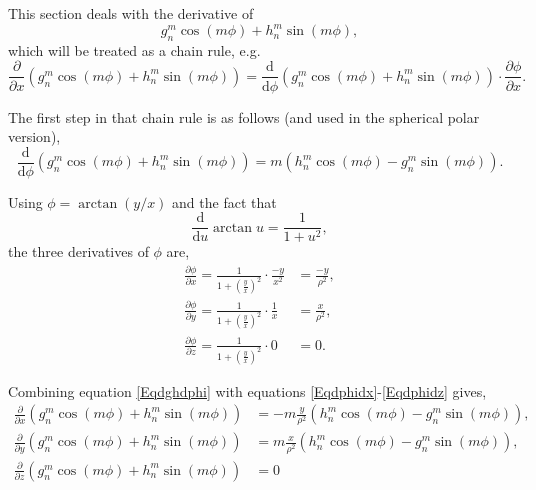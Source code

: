 \documentclass[]{article}
\begin{document}
			This section deals with the derivative of
			\begin{equation}
				g_n^m \cos{(m\phi)} + h_n^m\sin{(m\phi)},
			\end{equation}	
			which will be treated as a chain rule, e.g.
			\begin{equation}
				\frac{\partial}{\partial x}\left(g_n^m \cos{(m\phi)} + h_n^m\sin{(m\phi)}\right) = \frac{\text{d}}{\text{d}\phi}\left(g_n^m \cos{(m\phi)} + h_n^m\sin{(m\phi)}\right)\cdot\frac{\partial\phi}{\partial x}.
			\end{equation}
			
			The first step in that chain rule is as follows (and used in the spherical polar version),
			\begin{equation}
				\frac{\text{d}}{\text{d}\phi}\left(g_n^m \cos{(m\phi)} + h_n^m\sin{(m\phi)}\right) = m\left( h_n^m \cos{(m\phi)} - g_n^m \sin{(m\phi)}\right). \label{Eqdghdphi}
			\end{equation}
			
			Using $\phi = \arctan{(y/x)}$ and the fact that
			\begin{equation}
				\frac{\text{d}}{\text{d} u} \arctan{u} = \frac{1}{1 + u^2},
			\end{equation}
			the three derivatives of $\phi$ are,
			\begin{align}
				\frac{\partial \phi}{\partial x} = \frac{1}{1 + \left(\frac{y}{x}\right)^2}\cdot\frac{-y}{x^2} &= \frac{-y}{\rho^2}, \label{Eqdphidx} \\
				\frac{\partial \phi}{\partial y} = \frac{1}{1 + \left(\frac{y}{x}\right)^2}\cdot\frac{1}{x} &= \frac{x}{\rho^2},\label{Eqdphidy} \\ 
				\frac{\partial \phi}{\partial z} = \frac{1}{1 + \left(\frac{y}{x}\right)^2}\cdot 0 &= 0. \label{Eqdphidz}
			\end{align}
			
			Combining equation \ref{Eqdghdphi} with equations \ref{Eqdphidx}-\ref{Eqdphidz} gives,
			\begin{align}
				\frac{\partial}{\partial x}\left(g_n^m \cos{(m\phi)} + h_n^m\sin{(m\phi)}\right) &= -m\frac{y}{\rho^2}\left( h_n^m \cos{(m\phi)} - g_n^m \sin{(m\phi)}\right), \\
				\frac{\partial}{\partial y}\left(g_n^m \cos{(m\phi)} + h_n^m\sin{(m\phi)}\right) &= m\frac{x}{\rho^2}\left( h_n^m \cos{(m\phi)} - g_n^m \sin{(m\phi)}\right), \\
				\frac{\partial}{\partial z}\left(g_n^m \cos{(m\phi)} + h_n^m\sin{(m\phi)}\right) &= 0
			\end{align}
		
\end{document}
